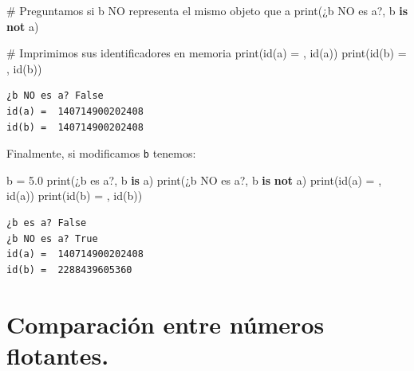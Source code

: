 \documentclass[
  spanish,
  letterpaper,
]{scrbook}
\newenvironment{Shaded}{\begin{snugshade}}{\end{snugshade}}
\newcommand{\BuiltInTok}[1]{\textcolor[rgb]{0.00,0.23,0.31}{#1}}
\newcommand{\CommentTok}[1]{\textcolor[rgb]{0.37,0.37,0.37}{#1}}
\newcommand{\FloatTok}[1]{\textcolor[rgb]{0.68,0.00,0.00}{#1}}
\newcommand{\KeywordTok}[1]{\textcolor[rgb]{0.00,0.23,0.31}{\textbf{#1}}}
\newcommand{\NormalTok}[1]{\textcolor[rgb]{0.00,0.23,0.31}{#1}}
\newcommand{\OperatorTok}[1]{\textcolor[rgb]{0.37,0.37,0.37}{#1}}
\newcommand{\StringTok}[1]{\textcolor[rgb]{0.13,0.47,0.30}{#1}}
\theoremstyle{definition}
\theoremstyle{remark}
\begin{document}
\begin{Shaded}
\begin{Highlighting}[]
\CommentTok{\# Preguntamos si \textquotesingle{}b\textquotesingle{} NO representa el mismo objeto que \textquotesingle{}a\textquotesingle{}}
\BuiltInTok{print}\NormalTok{(}\StringTok{\textquotesingle{}¿b NO es a?\textquotesingle{}}\NormalTok{, b }\KeywordTok{is} \KeywordTok{not}\NormalTok{ a)}

\CommentTok{\# Imprimimos sus identificadores en memoria}
\BuiltInTok{print}\NormalTok{(}\StringTok{\textquotesingle{}id(a) = \textquotesingle{}}\NormalTok{, }\BuiltInTok{id}\NormalTok{(a))}
\BuiltInTok{print}\NormalTok{(}\StringTok{\textquotesingle{}id(b) = \textquotesingle{}}\NormalTok{, }\BuiltInTok{id}\NormalTok{(b))}
\end{Highlighting}
\end{Shaded}

\begin{verbatim}
¿b NO es a? False
id(a) =  140714900202408
id(b) =  140714900202408
\end{verbatim}

Finalmente, si modificamos \texttt{b} tenemos:

\begin{Shaded}
\begin{Highlighting}[]
\NormalTok{b }\OperatorTok{=} \FloatTok{5.0}
\BuiltInTok{print}\NormalTok{(}\StringTok{\textquotesingle{}¿b es a?\textquotesingle{}}\NormalTok{, b }\KeywordTok{is}\NormalTok{ a)}
\BuiltInTok{print}\NormalTok{(}\StringTok{\textquotesingle{}¿b NO es a?\textquotesingle{}}\NormalTok{, b }\KeywordTok{is} \KeywordTok{not}\NormalTok{ a)}
\BuiltInTok{print}\NormalTok{(}\StringTok{\textquotesingle{}id(a) = \textquotesingle{}}\NormalTok{, }\BuiltInTok{id}\NormalTok{(a))}
\BuiltInTok{print}\NormalTok{(}\StringTok{\textquotesingle{}id(b) = \textquotesingle{}}\NormalTok{, }\BuiltInTok{id}\NormalTok{(b))}
\end{Highlighting}
\end{Shaded}

\begin{verbatim}
¿b es a? False
¿b NO es a? True
id(a) =  140714900202408
id(b) =  2288439605360
\end{verbatim}

\section{Comparación entre números
flotantes.}\label{comparaciuxf3n-entre-nuxfameros-flotantes.}
\end{document}
